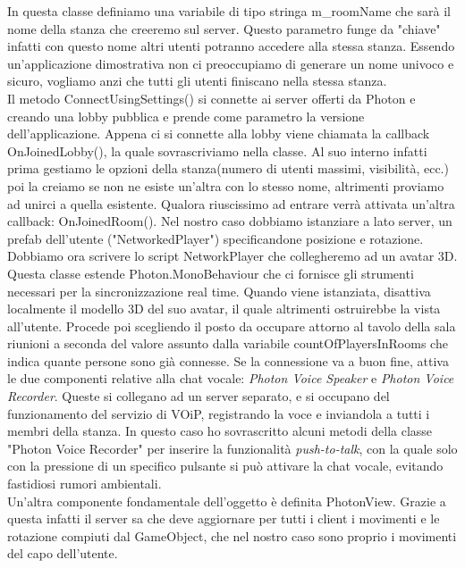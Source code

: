 In questa classe definiamo una variabile di tipo stringa m\_roomName che sarà il nome della stanza che creeremo sul server. Questo parametro funge da "chiave" infatti con questo nome altri utenti potranno accedere alla stessa stanza. Essendo un'applicazione dimostrativa non ci preoccupiamo di generare un nome univoco e sicuro, vogliamo anzi che tutti gli utenti finiscano nella stessa stanza. \\
Il metodo ConnectUsingSettings() si connette ai server offerti da Photon e creando una lobby pubblica e prende come parametro la versione dell'applicazione. Appena ci si connette alla lobby viene chiamata la callback OnJoinedLobby(), la quale sovrascriviamo nella classe. Al suo interno infatti prima gestiamo le opzioni della stanza(numero di utenti massimi, visibilità, ecc.) poi la creiamo se non ne esiste un'altra con lo stesso nome, altrimenti proviamo ad unirci a quella esistente. Qualora riuscissimo ad entrare verrà attivata un'altra callback: OnJoinedRoom(). Nel nostro caso dobbiamo istanziare a lato server, un prefab dell'utente ("NetworkedPlayer") specificandone posizione e rotazione.\\

Dobbiamo ora scrivere lo script NetworkPlayer che collegheremo ad un avatar 3D. Questa classe estende Photon.MonoBehaviour che ci fornisce gli strumenti necessari per la sincronizzazione real time. Quando viene istanziata, disattiva localmente il modello 3D del suo avatar, il quale altrimenti ostruirebbe la vista all'utente. Procede poi  scegliendo il posto da occupare attorno al tavolo della sala riunioni a seconda del valore assunto dalla variabile countOfPlayersInRooms che indica quante persone sono già connesse. Se la connessione va a buon fine, attiva le due componenti relative alla chat vocale: \textit{Photon Voice Speaker} e \textit{Photon Voice Recorder}. Queste si collegano ad un server separato, e si occupano del funzionamento del servizio di VOiP, registrando la voce e inviandola a tutti i membri della stanza. In questo caso ho sovrascritto alcuni metodi della classe "Photon Voice Recorder" per inserire la funzionalità \textit{push-to-talk}, con la quale solo con la pressione di un specifico pulsante si può attivare la chat vocale, evitando fastidiosi rumori ambientali.\\
Un'altra componente fondamentale dell'oggetto è definita PhotonView. Grazie a questa infatti il server sa che deve aggiornare per tutti i client i movimenti e le rotazione compiuti dal GameObject, che nel nostro caso sono proprio i movimenti del capo dell'utente.

